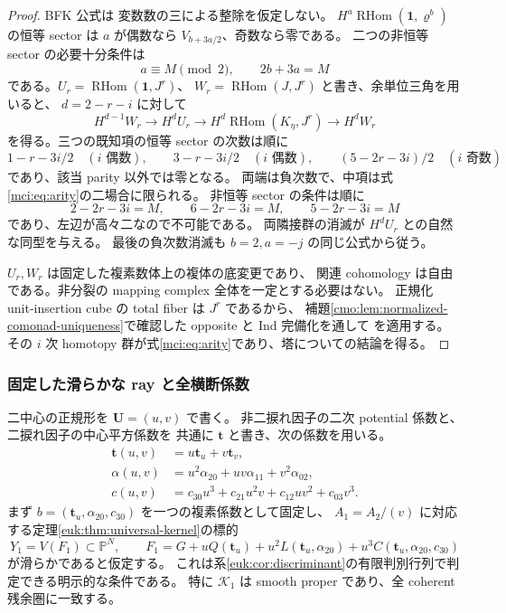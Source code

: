 \begin{proof}
BFK 公式\cite[Theorem~5.39 and proof, pp.~82--84]{NFBFKKernels}は
変数数の三による整除を仮定しない。
$H^a\operatorname{RHom}(\mathbf1,\varrho^b)$ の恒等 sector は
$a$ が偶数なら $V_{b+3a/2}$、奇数なら零である。
二つの非恒等 sector の必要十分条件は
\[
                  a\equiv M\pmod2,\qquad 2b+3a=M
\]
である。$U_r=\operatorname{RHom}(\mathbf1,J^r)$、
$W_r=\operatorname{RHom}(J,J^r)$ と書き、余単位三角を用いると、
$d=2-r-i$ に対して
\[
 H^{d-1}W_r\longrightarrow H^dU_r\longrightarrow
 H^d\operatorname{RHom}(K_\eta,J^r)\longrightarrow H^dW_r
\]
を得る。三つの既知項の恒等 sector の次数は順に
\[
 1-r-3i/2\quad(i\text{ 偶数}),\qquad
 3-r-3i/2\quad(i\text{ 偶数}),\qquad
 (5-2r-3i)/2\quad(i\text{ 奇数})
\]
であり、該当 parity 以外では零となる。
両端は負次数で、中項は式\eqref{mci:eq:arity}の二場合に限られる。
非恒等 sector の条件は順に
\[
 2-2r-3i=M,\qquad 6-2r-3i=M,\qquad 5-2r-3i=M
\]
であり、左辺が高々二なので不可能である。
両隣接群の消滅が $H^dU_r$ との自然な同型を与える。
最後の負次数消滅も $b=2,a=-j$ の同じ公式から従う。

$U_r,W_r$ は固定した複素数体上の複体の底変更であり、
関連 cohomology は自由である。非分裂の mapping complex 全体を一定とする必要はない。
正規化 unit-insertion cube の total fiber は $J^r$ であるから、
補題\ref{cmo:lem:normalized-comonad-uniqueness}で確認した opposite と Ind 完備化を通して
\cite[Theorem~3.3, Lemma~3.11]{CMOWillumsgaardAssociativity}を適用する。
その $i$ 次 homotopy 群が式\eqref{mci:eq:arity}であり、塔についての結論を得る。
\end{proof}

\subsubsection{固定した滑らかな ray と全横断係数}

二中心の正規形を $\mathbf U=(u,v)$ で書く。
非二捩れ因子の二次 potential 係数と、二捩れ因子の中心平方係数を
共通に $\mathbf t$ と書き、次の係数を用いる。
\begin{equation}\label{mci:eq:two-center-parameters}
 \begin{split}
 \mathbf t(u,v)&=u\mathbf t_u+v\mathbf t_v,\\
 \alpha(u,v)&=u^2\alpha_{20}+uv\alpha_{11}+v^2\alpha_{02},\\
 c(u,v)&=c_{30}u^3+c_{21}u^2v+c_{12}uv^2+c_{03}v^3.
 \end{split}
\end{equation}
まず $b=(\mathbf t_u,\alpha_{20},c_{30})$ を一つの複素係数として固定し、
$A_1=A_2/(v)$ に対応する定理\ref{euk:thm:universal-kernel}の標的
\begin{equation}\label{mci:eq:fixed-boundary}
 Y_1=V(F_1)\subset\mathbb P^N,\qquad
 F_1=G+uQ(\mathbf t_u)+u^2L(\mathbf t_u,\alpha_{20})
                  +u^3C(\mathbf t_u,\alpha_{20},c_{30})
\end{equation}
が滑らかであると仮定する。
これは系\ref{euk:cor:discriminant}の有限判別行列で判定できる明示的な条件である。
特に $\mathcal K_1$ は smooth proper であり、全 coherent 残余圏に一致する。

